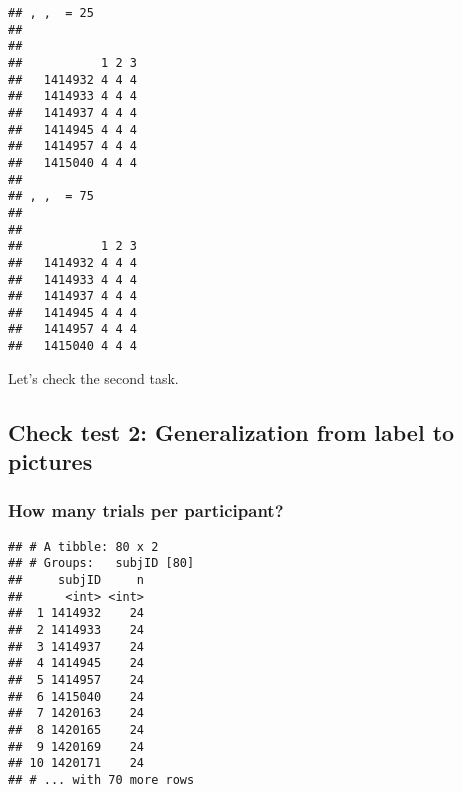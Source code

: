 \documentclass[
]{article}
\newenvironment{Shaded}{\begin{snugshade}}{\end{snugshade}}
\newcommand{\KeywordTok}[1]{\textcolor[rgb]{0.13,0.29,0.53}{\textbf{#1}}}
\newcommand{\NormalTok}[1]{#1}
\newcommand{\OperatorTok}[1]{\textcolor[rgb]{0.81,0.36,0.00}{\textbf{#1}}}
\newcommand{\StringTok}[1]{\textcolor[rgb]{0.31,0.60,0.02}{#1}}
\begin{document}
\begin{verbatim}
## , ,  = 25
## 
##          
##           1 2 3
##   1414932 4 4 4
##   1414933 4 4 4
##   1414937 4 4 4
##   1414945 4 4 4
##   1414957 4 4 4
##   1415040 4 4 4
## 
## , ,  = 75
## 
##          
##           1 2 3
##   1414932 4 4 4
##   1414933 4 4 4
##   1414937 4 4 4
##   1414945 4 4 4
##   1414957 4 4 4
##   1415040 4 4 4
\end{verbatim}

Let's check the second task.

\hypertarget{check-test-2-generalization-from-label-to-pictures}{%
\subsection{Check test 2: Generalization from label to
pictures}\label{check-test-2-generalization-from-label-to-pictures}}

\begin{Shaded}
\end{Shaded}

\hypertarget{how-many-trials-per-participant-1}{%
\subsubsection{How many trials per
participant?}\label{how-many-trials-per-participant-1}}

\begin{Shaded}
\end{Shaded}

\begin{verbatim}
## # A tibble: 80 x 2
## # Groups:   subjID [80]
##     subjID     n
##      <int> <int>
##  1 1414932    24
##  2 1414933    24
##  3 1414937    24
##  4 1414945    24
##  5 1414957    24
##  6 1415040    24
##  7 1420163    24
##  8 1420165    24
##  9 1420169    24
## 10 1420171    24
## # ... with 70 more rows
\end{verbatim}
\end{document}
